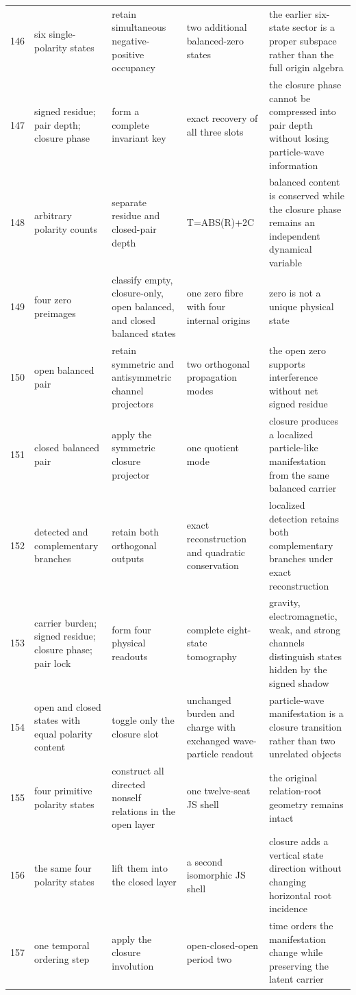 \documentclass[11pt]{article}
\numberwithin{equation}{section}
\theoremstyle{remark}
\begin{document}
\begin{landscape}
\begin{longtable}{p{0.65cm}p{3.5cm}p{4.0cm}p{4.0cm}p{4.6cm}}
146&six single-polarity states&retain simultaneous negative-positive occupancy&two additional balanced-zero states&the earlier six-state sector is a proper subspace rather than the full origin algebra\\
147&signed residue; pair depth; closure phase&form a complete invariant key&exact recovery of all three slots&the closure phase cannot be compressed into pair depth without losing particle-wave information\\
148&arbitrary polarity counts&separate residue and closed-pair depth&T=ABS(R)+2C&balanced content is conserved while the closure phase remains an independent dynamical variable\\
149&four zero preimages&classify empty, closure-only, open balanced, and closed balanced states&one zero fibre with four internal origins&zero is not a unique physical state\\
150&open balanced pair&retain symmetric and antisymmetric channel projectors&two orthogonal propagation modes&the open zero supports interference without net signed residue\\
151&closed balanced pair&apply the symmetric closure projector&one quotient mode&closure produces a localized particle-like manifestation from the same balanced carrier\\
152&detected and complementary branches&retain both orthogonal outputs&exact reconstruction and quadratic conservation&localized detection retains both complementary branches under exact reconstruction\\
153&carrier burden; signed residue; closure phase; pair lock&form four physical readouts&complete eight-state tomography&gravity, electromagnetic, weak, and strong channels distinguish states hidden by the signed shadow\\
154&open and closed states with equal polarity content&toggle only the closure slot&unchanged burden and charge with exchanged wave-particle readout&particle-wave manifestation is a closure transition rather than two unrelated objects\\
155&four primitive polarity states&construct all directed nonself relations in the open layer&one twelve-seat JS shell&the original relation-root geometry remains intact\\
156&the same four polarity states&lift them into the closed layer&a second isomorphic JS shell&closure adds a vertical state direction without changing horizontal root incidence\\
157&one temporal ordering step&apply the closure involution&open-closed-open period two&time orders the manifestation change while preserving the latent carrier\\

\end{longtable}
\end{landscape}
\end{document}
